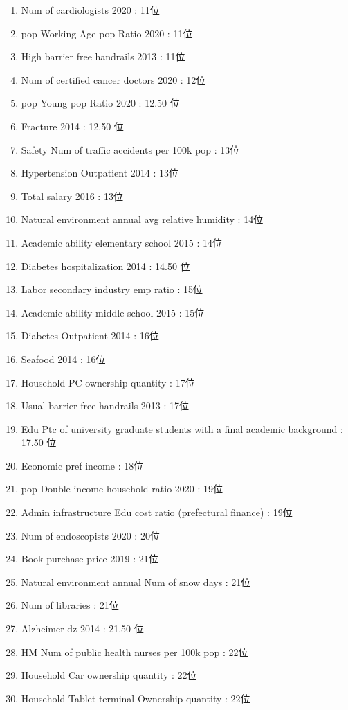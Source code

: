 \begin{multicols}{2}
\begin{enumerate}
	\item Num of cardiologists 2020 : 11位
	\item pop Working Age pop Ratio 2020 : 11位
	\item High barrier free handrails 2013 : 11位
	\item Num of certified cancer doctors 2020 : 12位
	\item pop Young pop Ratio 2020 : 12.50 位
	\item Fracture 2014 : 12.50 位
	\item Safety Num of traffic accidents per 100k pop : 13位
	\item Hypertension Outpatient 2014 : 13位
	\item Total salary 2016 : 13位
	\item Natural environment annual avg relative humidity : 14位
	\item Academic ability elementary school 2015 : 14位
	\item Diabetes hospitalization 2014 : 14.50 位
	\item Labor secondary industry emp ratio : 15位
	\item Academic ability middle school 2015 : 15位
	\item Diabetes Outpatient 2014 : 16位
	\item Seafood 2014 : 16位
	\item Household PC ownership quantity : 17位
	\item Usual barrier free handrails 2013 : 17位
	\item Edu Ptc of university graduate students with a final academic background : 17.50 位
	\item Economic pref income : 18位
	\item pop Double income household ratio 2020 : 19位
	\item Admin infrastructure Edu cost ratio (prefectural finance) : 19位
	\item Num of endoscopists 2020 : 20位
	\item Book purchase price 2019 : 21位
	\item Natural environment annual Num of snow days : 21位
	\item Num of libraries : 21位
	\item Alzheimer dz 2014 : 21.50 位
	\item HM Num of public health nurses per 100k pop : 22位
	\item Household Car ownership quantity : 22位
	\item Household Tablet terminal Ownership quantity : 22位

\end{enumerate}
\end{multicols}
